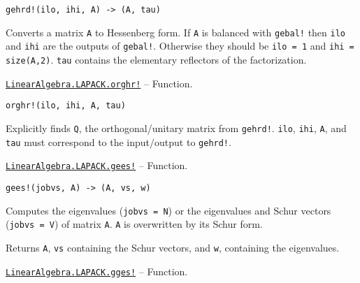 \begin{adjustwidth}{2em}{0pt}


\begin{verbatim}
gehrd!(ilo, ihi, A) -> (A, tau)
\end{verbatim}

Converts a matrix \texttt{A} to Hessenberg form. If \texttt{A} is balanced with \texttt{gebal!} then \texttt{ilo} and \texttt{ihi} are the outputs of \texttt{gebal!}. Otherwise they should be \texttt{ilo = 1} and \texttt{ihi = size(A,2)}. \texttt{tau} contains the elementary reflectors of the factorization.



\end{adjustwidth}
\hypertarget{17531257454072185780}{} 
\hyperlink{17531257454072185780}{\texttt{LinearAlgebra.LAPACK.orghr!}}  -- {Function.}

\begin{adjustwidth}{2em}{0pt}


\begin{verbatim}
orghr!(ilo, ihi, A, tau)
\end{verbatim}

Explicitly finds \texttt{Q}, the orthogonal/unitary matrix from \texttt{gehrd!}. \texttt{ilo}, \texttt{ihi}, \texttt{A}, and \texttt{tau} must correspond to the input/output to \texttt{gehrd!}.



\end{adjustwidth}
\hypertarget{7554800805540125473}{} 
\hyperlink{7554800805540125473}{\texttt{LinearAlgebra.LAPACK.gees!}}  -- {Function.}

\begin{adjustwidth}{2em}{0pt}


\begin{verbatim}
gees!(jobvs, A) -> (A, vs, w)
\end{verbatim}

Computes the eigenvalues (\texttt{jobvs = N}) or the eigenvalues and Schur vectors (\texttt{jobvs = V}) of matrix \texttt{A}. \texttt{A} is overwritten by its Schur form.

Returns \texttt{A}, \texttt{vs} containing the Schur vectors, and \texttt{w}, containing the eigenvalues.



\end{adjustwidth}
\hypertarget{9858205807823882594}{} 
\hyperlink{9858205807823882594}{\texttt{LinearAlgebra.LAPACK.gges!}}  -- {Function.}

